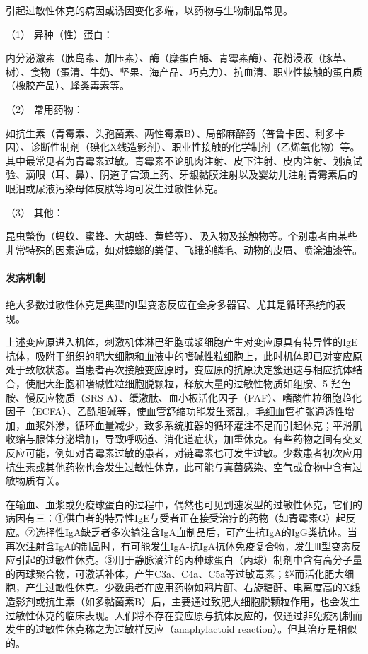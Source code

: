引起过敏性休克的病因或诱因变化多端，以药物与生物制品常见。

\hypertarget{text00063.htmlux5cux23CHP2-5-1-1-1}{}
（1） 异种（性）蛋白：

内分泌激素（胰岛素、加压素）、酶（糜蛋白酶、青霉素酶）、花粉浸液（豚草、树）、食物（蛋清、牛奶、坚果、海产品、巧克力）、抗血清、职业性接触的蛋白质（橡胶产品）、蜂类毒素等。

\hypertarget{text00063.htmlux5cux23CHP2-5-1-1-2}{}
（2） 常用药物：

如抗生素（青霉素、头孢菌素、两性霉素B）、局部麻醉药（普鲁卡因、利多卡因）、诊断性制剂（碘化X线造影剂）、职业性接触的化学制剂（乙烯氧化物）等。其中最常见者为青霉素过敏。青霉素不论肌肉注射、皮下注射、皮内注射、划痕试验、滴眼（耳、鼻）、阴道子宫颈上药、牙龈黏膜注射以及婴幼儿注射青霉素后的眼泪或尿液污染母体皮肤等均可发生过敏性休克。

\hypertarget{text00063.htmlux5cux23CHP2-5-1-1-3}{}
（3） 其他：

昆虫螫伤（蚂蚁、蜜蜂、大胡蜂、黄蜂等）、吸入物及接触物等。个别患者由某些非常特殊的因素造成，如对蟑螂的粪便、飞蛾的鳞毛、动物的皮屑、喷涂油漆等。

\paragraph{发病机制}

绝大多数过敏性休克是典型的Ⅰ型变态反应在全身多器官、尤其是循环系统的表现。

上述变应原进入机体，刺激机体淋巴细胞或浆细胞产生对变应原具有特异性的IgE抗体，吸附于组织的肥大细胞和血液中的嗜碱性粒细胞上，此时机体即已对变应原处于致敏状态。当患者再次接触变应原时，变应原的抗原决定簇迅速与相应抗体结合，使肥大细胞和嗜碱性粒细胞脱颗粒，释放大量的过敏性物质如组胺、5-羟色胺、慢反应物质（SRS-A）、缓激肽、血小板活化因子（PAF）、嗜酸性粒细胞趋化因子（ECFA）、乙酰胆碱等，使血管舒缩功能发生紊乱，毛细血管扩张通透性增加，血浆外渗，循环血量减少，致多系统脏器的循环灌注不足而引起休克；平滑肌收缩与腺体分泌增加，导致呼吸道、消化道症状，加重休克。有些药物之间有交叉反应可能，例如对青霉素过敏的患者，对链霉素也可发生过敏。少数患者初次应用抗生素或其他药物也会发生过敏性休克，此可能与真菌感染、空气或食物中含有过敏物质有关。

在输血、血浆或免疫球蛋白的过程中，偶然也可见到速发型的过敏性休克，它们的病因有三：①供血者的特异性IgE与受者正在接受治疗的药物（如青霉素G）起反应。②选择性IgA缺乏者多次输注含IgA血制品后，可产生抗IgA的IgG类抗体。当再次注射含IgA的制品时，有可能发生IgA-抗IgA抗体免疫复合物，发生Ⅲ型变态反应引起的过敏性休克。③用于静脉滴注的丙种球蛋白（丙球）制剂中含有高分子量的丙球聚合物，可激活补体，产生C3a、C4a、C5a等过敏毒素；继而活化肥大细胞，产生过敏性休克。少数患者在应用药物如鸦片酊、右旋糖酐、电离度高的X线造影剂或抗生素（如多黏菌素B）后，主要通过致肥大细胞脱颗粒作用，也会发生过敏性休克的临床表现。人们将不存在变应原与抗体反应的，仅通过非免疫机制而发生的过敏性休克称之为过敏样反应（anaphylactoid
reaction）。但其治疗是相似的。

